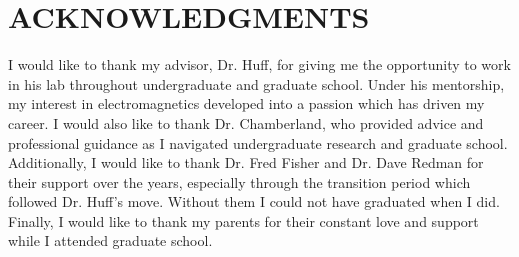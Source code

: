 %
%
%
%


\chapter*{ACKNOWLEDGMENTS}


\indent I would like to thank my advisor, Dr. Huff, for giving me the opportunity to work in his lab throughout undergraduate and graduate school. Under his mentorship, my interest in electromagnetics developed into a passion which has driven my career. I would also like to thank Dr. Chamberland, who provided advice and professional guidance as I navigated undergraduate research and graduate school. Additionally, I would like to thank Dr. Fred Fisher and Dr. Dave Redman for their support over the years, especially through the transition period which followed Dr. Huff's move. Without them I could not have graduated when I did. Finally, I would like to thank my parents for their constant love and support while I attended graduate school. 

\pagebreak{}